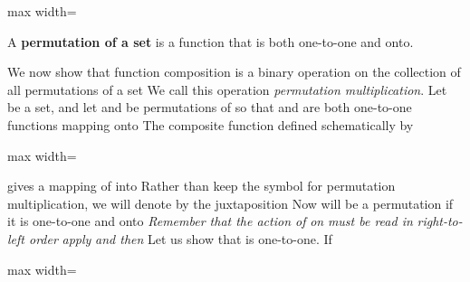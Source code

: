 \documentclass[11pt,oneside]{article}
\begin{document}
\begin{BookBody}
\begin{center}\begin{adjustbox}{max width=\linewidth}\end{adjustbox}\end{center}

 A\textbf{ permutation of a set}  is a function  that is both one-to-one and onto. \BookEnd{\blacksquare}


\noindent We now show that function composition \BookInline{\circ } is a binary operation on the collection of all permutations of a set  We call this operation\textit{ permutation multiplication}. Let  be a set, and let \BookInline{\sigma } and \BookInline{\tau } be permutations of  so that \BookInline{\sigma } and \BookInline{\tau } are both one-to-one functions mapping  onto  The composite function \BookInline{\sigma \circ \tau } defined schematically by

\begin{center}\begin{adjustbox}{max width=\linewidth}\end{adjustbox}\end{center}

\noindent gives a mapping of  into  Rather than keep the symbol \BookInline{\circ } for permutation multiplication, we will denote \BookInline{\sigma \circ \tau } by the juxtaposition  Now \BookInline{\sigma \tau } will be a permutation if it is one-to-one and onto  \textit{Remember that the action of} \BookInline{\sigma \tau } \textit{on}  \textit{must be read in} \textit{right-to-left order} \textit{apply} \BookInline{\tau } \textit{and then}  Let us show that \BookInline{\sigma \tau } is one-to-one. If

\begin{center}\begin{adjustbox}{max width=\linewidth}\end{adjustbox}\end{center}

\end{BookBody}
\end{document}
